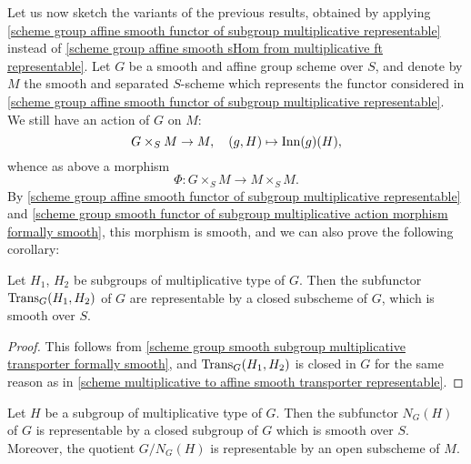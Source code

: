Let us now sketch the variants of the previous results, obtained by applying \cref{scheme group affine smooth functor of subgroup multiplicative representable} instead of \cref{scheme group affine smooth sHom from multiplicative ft representable}. Let $G$ be a smooth and affine group scheme over $S$, and denote by $M$ the smooth and separated $S$-scheme which represents the functor considered in \cref{scheme group affine smooth functor of subgroup multiplicative representable}. We still have an action of $G$ on $M$:
\[G\times_SM\to M,\quad (g,H)\mapsto\mathrm{Inn}(g)(H),\]
whence as above a morphism
\begin{equation}\label{scheme group affine smooth functor of subgroup multiplicative action morphism}
\Phi:G\times_SM\to M\times_SM.
\end{equation}
By \cref{scheme group affine smooth functor of subgroup multiplicative representable} and \cref{scheme group smooth functor of subgroup multiplicative action morphism formally smooth}, this morphism is smooth, and we can also prove the following corollary:

\begin{corollary}\label{scheme smooth affine subgroup multiplicative transporter representable}
Let $H_1$, $H_2$ be subgroups of multiplicative type of $G$. Then the subfunctor $\mathrm{Trans}_G(H_1,H_2)$ of $G$ are representable by a closed subscheme of $G$, which is smooth over $S$.
\end{corollary}
\begin{proof}
This follows from \cref{scheme group smooth subgroup multiplicative transporter formally smooth}, and $\mathrm{Trans}_G(H_1,H_2)$ is closed in $G$ for the same reason as in \cref{scheme multiplicative to affine smooth transporter representable}.
\end{proof}

\begin{corollary}\label{scheme smooth affine subgroup multiplicative normalizer representable}
Let $H$ be a subgroup of multiplicative type of $G$. Then the subfunctor $N_G(H)$ of $G$ is representable by a closed subgroup of $G$ which is smooth over $S$. Moreover, the quotient $G/N_G(H)$ is representable by an open subscheme of $M$.
\end{corollary}

